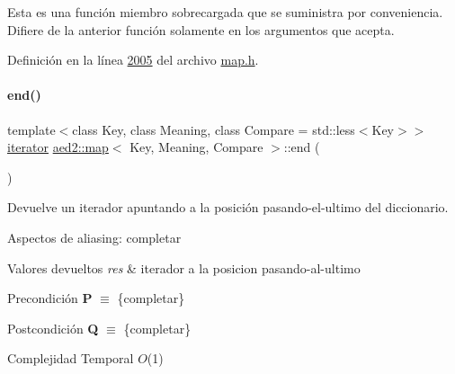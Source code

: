 Esta es una función miembro sobrecargada que se suministra por conveniencia. Difiere de la anterior función solamente en los argumentos que acepta. 

Definición en la línea \hyperlink{map_8h_source_l02005}{2005} del archivo \hyperlink{map_8h_source}{map.\+h}.

\mbox{\label{classaed2_1_1map_a76023e6a56cb625513e1b5ea028bf983_a76023e6a56cb625513e1b5ea028bf983}} 
\paragraph{\texorpdfstring{end()}{end()}\hspace{0.1cm}{\footnotesize\ttfamily [1/2]}}
{\footnotesize\ttfamily template$<$class Key, class Meaning, class Compare = std\+::less$<$\+Key$>$$>$ \\
\hyperlink{classaed2_1_1map_1_1iterator}{iterator} \hyperlink{classaed2_1_1map}{aed2\+::map}$<$ Key, Meaning, Compare $>$\+::end (\begin{DoxyParamCaption}{ }\end{DoxyParamCaption})\hspace{0.3cm}{\ttfamily [inline]}}



Devuelve un iterador apuntando a la posición pasando-\/el-\/ultimo del diccionario. 

\begin{DoxyParagraph}{Aspectos de aliasing\+:}
completar
\end{DoxyParagraph}

\begin{DoxyRetVals}{Valores devueltos}
{\em res} & iterador a la posicion pasando-\/al-\/ultimo\\
\hline
\end{DoxyRetVals}
\begin{DoxyPrecond}{Precondición}
{\bfseries P} $\equiv$ \{completar\} 
\end{DoxyPrecond}
\begin{DoxyPostcond}{Postcondición}
{\bfseries Q} $\equiv$ \{completar\}
\end{DoxyPostcond}

\begin{DoxyDescription}
\item[Complejidad Temporal]$O$(1)
\end{DoxyDescription}

